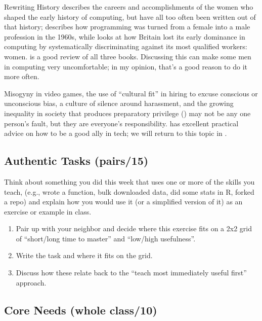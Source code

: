 \begin{aside}{Rewriting History}
  \cite{Abba2012} describes the careers and accomplishments of the
  women who shaped the early history of computing, but have all too
  often been written out of that history; \cite{Ensm2003,Ensm2012}
  describes how programming was turned from a female into a male
  profession in the 1960s, while \cite{Hick2018} looks at how Britain
  lost its early dominance in computing by systematically discriminating
  against its most qualified workers: women. \cite{Milt2018} is a
  good review of all three books. Discussing this can make some men in
  computing very uncomfortable; in my opinion, that's a good reason to
  do it more often.
\end{aside}

Misogyny in video games, the use of ``cultural fit'' in hiring to excuse
conscious or unconscious bias, a culture of silence around harassment,
and the growing inequality in society that produces preparatory
privilege () may not be any one person's
fault, but they are everyone's responsibility.  has excellent practical advice on how to be
a good ally in tech; we will return to this topic in
.


\subsection*{Authentic Tasks (pairs/15)}

Think about something you did this week that uses one or more of the
skills you teach, (e.g., wrote a function, bulk downloaded data, did
some stats in R, forked a repo) and explain how you would use it (or a
simplified version of it) as an exercise or example in class.

\begin{enumerate}
\item
  Pair up with your neighbor and decide where this exercise fits on a
  2x2 grid of ``short/long time to master'' and ``low/high
  usefulness''.
\item
  Write the task and where it fits on the grid.
\item
  Discuss how these relate back to the ``teach most immediately useful
  first'' approach.
\end{enumerate}

\subsection*{Core Needs (whole class/10)}

